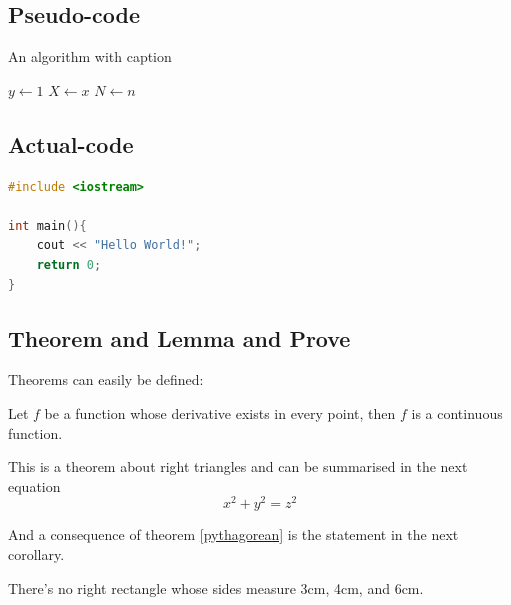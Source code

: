 \subsection{Pseudo-code}


\begin{algorithm}[hbt!]
\caption{An algorithm with caption}
$y \gets 1$\;
$X \gets x$\;
$N \gets n$\;
\end{algorithm}
\newpage

\subsection{Actual-code}

\begin{lstlisting}[caption=Sample Code Listing C++, label={lst:listing-cpp}, language=C++, style=mystyle]
#include <iostream>

int main(){
    cout << "Hello World!";
    return 0;
}
\end{lstlisting}

\subsection{Theorem and Lemma and Prove}
Theorems can easily be defined:

\begin{theorem}
Let \(f\) be a function whose derivative exists in every point, then \(f\) is 
a continuous function.
\end{theorem}

\begin{theorem}
\label{pythagorean}   %
This is a theorem about right triangles and can be summarised in the next 
equation 
\[ x^2 + y^2 = z^2 \]
\end{theorem}

And a consequence of theorem \ref{pythagorean} is the statement in the next 
corollary.

\begin{corollary}
There's no right rectangle whose sides measure 3cm, 4cm, and 6cm.
\end{corollary}

